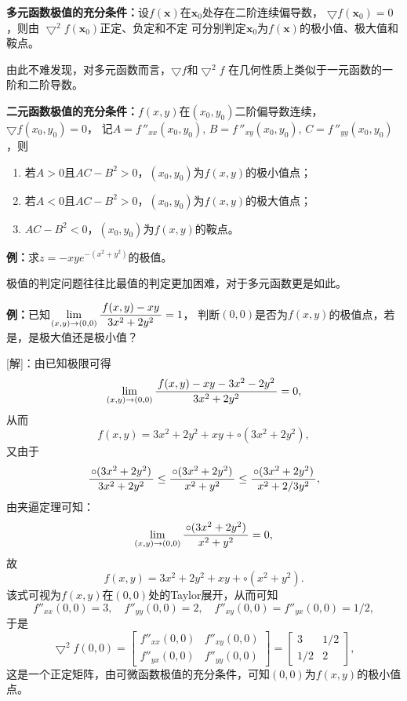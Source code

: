 \begin{thx}
	{\bf 多元函数极值的充分条件：}设$f(\bm{x})$在$\bm{x}_0$处存在二阶连续偏导数，
	$\bigtriangledown f(\bm{x}_0)=0$，则由
	$\bigtriangledown^2 f(\bm{x}_0)$正定、负定和不定
	可分别判定$\bm{x}_0$为$f(\bm{x})$的极小值、极大值和鞍点。
\end{thx}
由此不难发现，对多元函数而言，$\bigtriangledown f$和$\bigtriangledown^2 f$
在几何性质上类似于一元函数的一阶和二阶导数。
\begin{thx}
	{\bf 二元函数极值的充分条件：}$f(x,y)$在$(x_0,y_0)$二阶偏导数连续，$\bigtriangledown f(x_0,y_0)=0$，
	记$A=f\,''_{xx}(x_0,y_0),\,B=f\,''_{xy}(x_0,y_0),\,C=f\,''_{yy}(x_0,y_0)$，则
	\begin{enumerate}%
	  \item 若$A>0$且$AC-B^2>0$，$(x_0,y_0)$为$f(x,y)$的极小值点；
	  \item 若$A<0$且$AC-B^2>0$，$(x_0,y_0)$为$f(x,y)$的极大值点；
	  \item $AC-B^2<0$，$(x_0,y_0)$为$f(x,y)$的鞍点。
	\end{enumerate}
\end{thx}

{\bf 例：}求$z=-xye^{-(x^2+y^2)}$的极值。

极值的判定问题往往比最值的判定更加困难，对于多元函数更是如此。

{\bf 例：}已知$\lim\limits_{(x,y)\to(0,0)}\displaystyle\frac{\,{f(x,y)-xy}\,}{\,{3x^2+2y^2}\,}=1$，
判断$(0,0)$是否为$f(x,y)$的极值点，若是，是极大值还是极小值？

[解]：由已知极限可得
$$\lim\limits_{(x,y)\to(0,0)}\displaystyle\frac{\,{f(x,y)-xy-3x^2-2y^2}\,}{\,{3x^2+2y^2}\,}=0,$$
从而
$$f(x,y)=3x^2+2y^2+xy+\circ(3x^2+2y^2),$$
又由于
$$\displaystyle\frac{\,{\circ(3x^2+2y^2)}\,}{\,{3x^2+2y^2}\,}\leq\displaystyle\frac{\,{\circ(3x^2+2y^2)}\,}{\,{x^2+y^2}\,}
\leq\displaystyle\frac{\,{\circ(3x^2+2y^2)}\,}{\,{x^2+2/3y^2}\,},$$
由夹逼定理可知：
$$\lim\limits_{(x,y)\to(0,0)}\displaystyle\frac{\,{\circ(3x^2+2y^2)}\,}{\,{x^2+y^2}\,}=0,$$
故
$$f(x,y)=3x^2+2y^2+xy+\circ(x^2+y^2).$$
该式可视为$f(x,y)$在$(0,0)$处的Taylor展开，从而可知
$$f''_{xx}(0,0)=3,\quad f''_{yy}(0,0)=2,
\quad f''_{xy}(0,0)=f''_{yx}(0,0)=1/2,$$
于是
$$\bigtriangledown^2f(0,0)=\left[\begin{array}{cc}
f''_{xx}(0,0) & f''_{xy}(0,0) \\ f''_{yx}(0,0) & f''_{yy}(0,0)
\end{array}\right]
=\left[\begin{array}{cc}
3 & 1/2 \\ 1/2 &2
\end{array}\right],$$
这是一个正定矩阵，由可微函数极值的充分条件，可知$(0,0)$为$f(x,y)$的极小值点。
\fin

